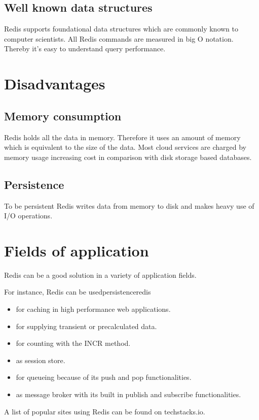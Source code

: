 \subsection{Well known data structures}
Redis supports foundational data structures which are commonly known to computer
scientists. All Redis commands are measured in big O notation. Thereby it’s easy
to understand query performance.

\section{Disadvantages}
\subsection{Memory consumption}
Redis holds all the data in memory. Therefore it uses an amount of memory which
is equivalent to the size of the data. Most cloud services are charged by memory
usage increasing cost in comparison with disk storage based databases.

\subsection{Persistence}
To be persistent Redis writes data from memory to disk and makes heavy use of
I/O operations.

\section{Fields of application}
Redis can be a good solution in a variety of application fields.

For instance, Redis can be usedpersistenceredis
\begin{itemize}
    \item for caching in high performance web applications.
    \item for supplying transient or precalculated data.
    \item for counting with the INCR method.
    \item as session store.
    \item for queueing because of its push and pop functionalities.
    \item as message broker with its built in publish and subscribe
    functionalities.
\end{itemize}
A list of popular sites using Redis can be found on techstacks.io.

